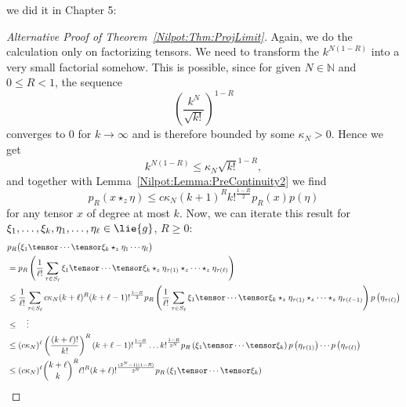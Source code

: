 we did it in Chapter 5:
\begin{proof}[Alternative Proof of Theorem~\ref{Nilpot:Thm:ProjLimit}]
	Again, we do the calculation only on factorizing tensors. We need to 
	transform the $k^{N(1-R)}$ into a very small factorial somehow. This is 
	possible, since for given $N \in \mathbb{N}$ and $0 \leq R < 1$, the 
	sequence
	\begin{equation*}
		\left( \frac{k^N}{\sqrt{k!}} \right)^{1-R}
	\end{equation*}
	converges to $0$ for $k \longrightarrow \infty$ and is therefore bounded 
	by some $\kappa_N > 0$. Hence we get
	\begin{equation*}
		k^{ N (1-R) } 
		\leq
		\kappa_N \sqrt{k!}^{1-R},
	\end{equation*}
	and together with Lemma~\ref{Nilpot:Lemma:PreContinuity2} we find
	\begin{equation*}
		p_R \left( x \star_z \eta \right)
		\leq
		c \kappa_N
		(k + 1)^R k!^{\frac{1-R}{2}} 
		p_R (x) p(\eta)
	\end{equation*}
	for any tensor $x$ of degree at most $k$. Now, we can iterate this result
	for $\xi_1, \ldots, \xi_k, \eta_1, \ldots, \eta_\ell 
	\in \lie{g}$, $R \geq 0$:
	\begin{align*}
		&
		p_R \big(
			\xi_1 \tensor \cdots \tensor \xi_k 
			\star_z 
			\eta_1 \cdots \eta_\ell
		\big)
		\\
		& =
		p_R \left(
			\frac{1}{\ell!}
			\sum\limits_{\tau \in S_\ell}
			\xi_1 \tensor \cdots \tensor  \xi_k 
			\star_z
			\eta_{\tau(1)} \star_z \cdots \star_z \eta_{\tau(\ell)}
		\right)
		\\
		& \leq
		\frac{1}{\ell!}
		\sum\limits_{\tau \in S_\ell}
		c \kappa_N
		(k + \ell)^R
		(k + \ell - 1)!^{\frac{1-R}{2}}
		p_R \left(
			\frac{1}{\ell!}
			\sum\limits_{\tau \in S_\ell}
			\xi_1 \tensor \cdots \tensor \xi_k 
			\star_z
			\eta_{\tau(1)} \star_z \cdots \star_z \eta_{\tau(\ell-1)}
		\right)
		p\left( \eta_{\tau(\ell)} \right)
		\\
		& \leq
		\quad \vdots
		\\
		& \leq
		(c \kappa_N)^{\ell}
		\left(
			\frac{(k + \ell)!}{k!}
		\right)^R
		(k + \ell - 1)!^{\frac{1-R}{2}}
		\ldots
		k!^{\frac{1-R}{2^N}}
		p_R \left( \xi_1 \tensor \cdots \tensor \xi_k \right)
		p\left( \eta_{\tau(1)} \right)
		\cdots
		p\left( \eta_{\tau(\ell)} \right)
		\\
		& \leq
		(c \kappa_N)^{\ell}
		\binom{k + \ell}{k}^R 
		\ell!^R
		(k + \ell)!^{\frac{(2^N - 1) (1-R)}{2^N} }
		p_R \left( \xi_1 \tensor \cdots \tensor \xi_k \right)

\end{align*}
\end{proof}
